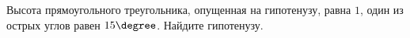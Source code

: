 \begin{ex}
	\begin{condition}
		Высота прямоугольного треугольника, опущенная на гипотенузу, равна \( 1 \), один из острых углов равен \( 15\degree\). Найдите гипотенузу.
	\end{condition}
\end{ex}